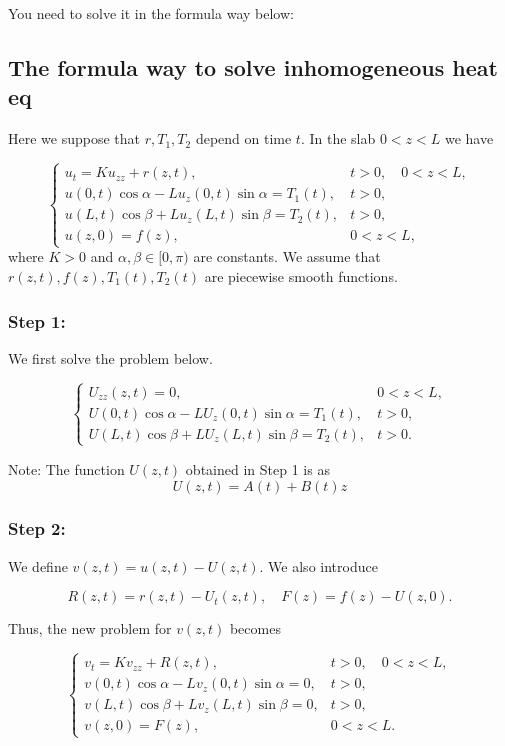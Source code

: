 \documentclass[lang=en,11pt]{template}
\begin{document}
\begin{solution}
You need to solve it in the formula way below:
\subsection*{The formula way to solve inhomogeneous heat eq}

Here we suppose that \( r, T_1, T_2 \) depend on time \( t \). In the slab \( 0 < z < L \) we have

\[
\begin{cases}
u_t = K u_{zz} + r(z,t), & t > 0, \quad 0 < z < L, \\
u(0,t) \cos \alpha - L u_z(0,t) \sin \alpha = T_1(t), & t > 0, \\
u(L,t) \cos \beta + L u_z(L,t) \sin \beta = T_2(t), & t > 0, \\
u(z,0) = f(z), & 0 < z < L,
\end{cases}
\]
where \( K > 0 \) and \( \alpha, \beta \in [0, \pi) \) are constants. We assume that \( r(z,t), f(z), T_1(t), T_2(t) \) are piecewise smooth functions.



\subsubsection*{Step 1:}
We first solve the problem below.

\[
\begin{cases}
U_{zz}(z,t) = 0, & 0 < z < L, \\
U(0,t) \cos \alpha - L U_z(0,t) \sin \alpha = T_1(t), & t > 0, \\
U(L,t) \cos \beta + L U_z(L,t) \sin \beta = T_2(t), & t > 0.
\end{cases}
\]

Note: The function $U(z,t)$ obtained in Step 1 is as
$$
U(z,t) = A(t) + B(t)z
$$

\subsubsection*{Step 2:}
We define \( v(z,t) = u(z,t) - U(z,t) \). We also introduce

\[
R(z,t) = r(z,t) - U_t(z,t), \quad F(z) = f(z) - U(z,0).
\]

Thus, the new problem for \( v(z,t) \) becomes

\[
\begin{cases}
v_t = K v_{zz} + R(z,t), & t > 0, \quad 0 < z < L, \\
v(0,t) \cos \alpha - L v_z(0,t) \sin \alpha = 0, & t > 0, \\
v(L,t) \cos \beta + L v_z(L,t) \sin \beta = 0, & t > 0, \\
v(z,0) = F(z), & 0 < z < L.
\end{cases}
\]


\end{solution}
\end{document}
